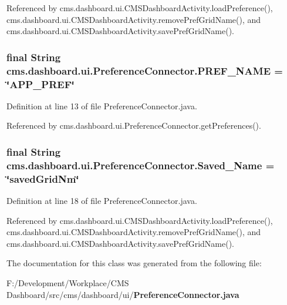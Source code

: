 \-Referenced by cms.\-dashboard.\-ui.\-C\-M\-S\-Dashboard\-Activity.\-load\-Preference(), cms.\-dashboard.\-ui.\-C\-M\-S\-Dashboard\-Activity.\-remove\-Pref\-Grid\-Name(), and cms.\-dashboard.\-ui.\-C\-M\-S\-Dashboard\-Activity.\-save\-Pref\-Grid\-Name().

\subsubsection[{\-P\-R\-E\-F\-\_\-\-N\-A\-M\-E}]{\setlength{\rightskip}{0pt plus 5cm}final \-String {\bf cms.\-dashboard.\-ui.\-Preference\-Connector.\-P\-R\-E\-F\-\_\-\-N\-A\-M\-E} = \char`\"{}\-A\-P\-P\-\_\-\-P\-R\-E\-F\char`\"{}\hspace{0.3cm}{\ttfamily  [static]}}\label{classcms_1_1dashboard_1_1ui_1_1_preference_connector_a9be32a3afcf666df8d0e64af979c847f}


\-Definition at line 13 of file \-Preference\-Connector.\-java.



\-Referenced by cms.\-dashboard.\-ui.\-Preference\-Connector.\-get\-Preferences().

\subsubsection[{\-Saved\-\_\-\-Name}]{\setlength{\rightskip}{0pt plus 5cm}final \-String {\bf cms.\-dashboard.\-ui.\-Preference\-Connector.\-Saved\-\_\-\-Name} = \char`\"{}saved\-Grid\-Nm\char`\"{}\hspace{0.3cm}{\ttfamily  [static]}}\label{classcms_1_1dashboard_1_1ui_1_1_preference_connector_a4925ba5e4a4732f3eb74d3d8dce773b9}


\-Definition at line 18 of file \-Preference\-Connector.\-java.



\-Referenced by cms.\-dashboard.\-ui.\-C\-M\-S\-Dashboard\-Activity.\-load\-Preference(), cms.\-dashboard.\-ui.\-C\-M\-S\-Dashboard\-Activity.\-remove\-Pref\-Grid\-Name(), and cms.\-dashboard.\-ui.\-C\-M\-S\-Dashboard\-Activity.\-save\-Pref\-Grid\-Name().



\-The documentation for this class was generated from the following file\-:\begin{DoxyCompactItemize}
\item 
\-F\-:/\-Development/\-Workplace/\-C\-M\-S Dashboard/src/cms/dashboard/ui/{\bf \-Preference\-Connector.\-java}\end{DoxyCompactItemize}
